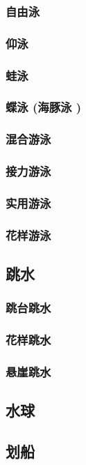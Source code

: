 \documentclass[UTF8]{../../ApplicationUniverse}
\begin{document}
        \subsubsection{自由泳}
        \subsubsection{仰泳}
        \subsubsection{蛙泳}
        \subsubsection{蝶泳 (海豚泳 )}
        \subsubsection{混合游泳}
        \subsubsection{接力游泳}
        \subsubsection{实用游泳}
        \subsubsection{花样游泳}
    \subsection{跳水}
        \subsubsection{跳台跳水}
        \subsubsection{花样跳水}
        \subsubsection{悬崖跳水}
    \subsection{水球}
    \subsection{划船}
\end{document}
